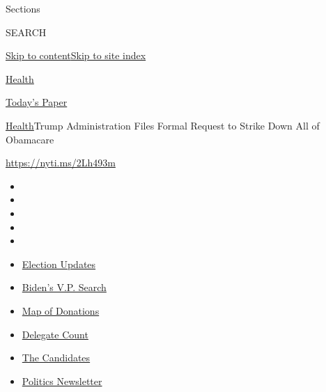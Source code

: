 Sections

SEARCH

\protect\hyperlink{site-content}{Skip to
content}\protect\hyperlink{site-index}{Skip to site index}

\href{https://www.nytimes.com/section/health}{Health}

\href{https://myaccount.nytimes.com/auth/login?response_type=cookie\&client_id=vi}{}

\href{https://www.nytimes.com/section/todayspaper}{Today's Paper}

\href{/section/health}{Health}\textbar{}Trump Administration Files
Formal Request to Strike Down All of Obamacare

\url{https://nyti.ms/2Lh493m}

\begin{itemize}
\item
\item
\item
\item
\item
\end{itemize}

\begin{itemize}
\item
  \href{https://www.nytimes.com/2020/07/31/us/elections/biden-vs-trump.html?action=click\&pgtype=Article\&state=default\&region=TOP_BANNER\&context=storylines_menu}{Election
  Updates}
\item
  \href{https://www.nytimes.com/article/biden-vice-president-2020.html?action=click\&pgtype=Article\&state=default\&region=TOP_BANNER\&context=storylines_menu}{Biden's
  V.P. Search}
\item
  \href{https://www.nytimes.com/interactive/2020/07/24/us/politics/trump-biden-campaign-donors.html?action=click\&pgtype=Article\&state=default\&region=TOP_BANNER\&context=storylines_menu}{Map
  of Donations}
\item
  \href{https://www.nytimes.com/interactive/2020/us/elections/delegate-count-primary-results.html?action=click\&pgtype=Article\&state=default\&region=TOP_BANNER\&context=storylines_menu}{Delegate
  Count}
\item
  \href{https://www.nytimes.com/interactive/2019/us/politics/2020-presidential-candidates.html?action=click\&pgtype=Article\&state=default\&region=TOP_BANNER\&context=storylines_menu}{The
  Candidates}
\item
  \href{https://www.nytimes.com/newsletters/politics?action=click\&pgtype=Article\&state=default\&region=TOP_BANNER\&context=storylines_menu}{Politics
  Newsletter}
\end{itemize}

